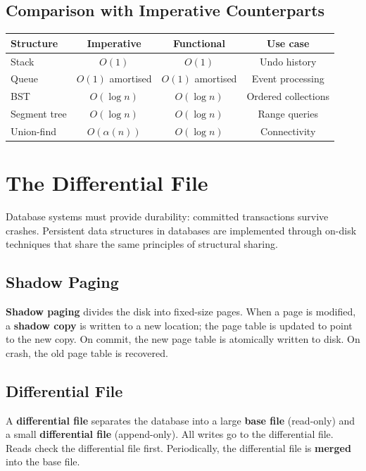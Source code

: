 \subsection{Comparison with Imperative Counterparts}

\begin{center}
\begin{tabular}{lccc}
\toprule
Structure & Imperative & Functional & Use case \\
\midrule
Stack & $O(1)$ & $O(1)$ & Undo history \\
Queue & $O(1)$ amortised & $O(1)$ amortised & Event processing \\
BST & $O(\log n)$ & $O(\log n)$ & Ordered collections \\
Segment tree & $O(\log n)$ & $O(\log n)$ & Range queries \\
Union-find & $O(\alpha(n))$ & $O(\log n)$ & Connectivity \\
\bottomrule
\end{tabular}
\end{center}

\section{The Differential File}
\label{sec21:differential-file}

Database systems must provide durability: committed transactions survive crashes. Persistent data structures in databases are implemented through on-disk techniques that share the same principles of structural sharing.

\subsection{Shadow Paging}

\textbf{Shadow paging} divides the disk into fixed-size pages. When a page is modified, a \textbf{shadow copy} is written to a new location; the page table is updated to point to the new copy. On commit, the new page table is atomically written to disk. On crash, the old page table is recovered.

\subsection{Differential File}

A \textbf{differential file} separates the database into a large \textbf{base file} (read-only) and a small \textbf{differential file} (append-only). All writes go to the differential file. Reads check the differential file first. Periodically, the differential file is \textbf{merged} into the base file.

